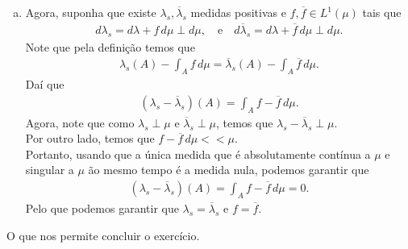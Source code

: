 \begin{homeworkProblem}[6]
\begin{solution}
\begin{enumerate}[a)]
      \begin{align*}
        \left( \lambda_s-\epsilon\mu \right)(B)=\lambda(B)-\int_{B}f\,d\mu-\epsilon\mu(B)\geq 0.
      \end{align*}
      Daí que
      \begin{align*}
        \lambda(B)\geq \int_{B}f+\epsilon\,d\mu,\quad\text{para todo }B\subseteq A.
      \end{align*}
      Logo, note que dado $C\in\cali{A}$ temos que pela desigualdade anterior e o item $b)$ podemos garantir que 
      \begin{align*}
        \lambda(C)=\lambda(A\cap C)+\lambda(C\setminus A)\geq \int_{A\cap C}f+\epsilon\,d\mu + \int_{C\setminus A}f\,d\mu=\int_{C}f+\epsilon\chi_{A}\,d\mu.
      \end{align*}
      Logo, $f+\epsilon\chi_A$ cumpre as condições de $S$, mas
      \begin{align*}
        \alpha=\int_{X}f\,d\mu<\int_{X}f\,d\mu +\epsilon\mu(A)\leq \int_{X}f+\epsilon\chi_{A}\,d\mu.
      \end{align*}
      O que contradice a maximalidade de $\alpha$. Assim, podemos garantir que $\lambda_s\perp \mu$.
    \item Agora, suponha que existe $\lambda_s,\overline{\lambda}_s$ medidas positivas e $f,\overline{f}\in L^{1}(\mu)$ tais que
      \begin{align*}
        d\lambda_s=d\lambda+f\,d\mu\perp d\mu,\quad\text{e}\quad d\overline{\lambda}_s=d\lambda+\overline{f}\,d\mu\perp d\mu.
      \end{align*}
      Note que pela definição temos que
      \begin{align*}
        \lambda_s(A)-\int_{A}f\,d\mu = \overline{\lambda}_s(A)-\int_{A}\overline{f}\,d\mu.
      \end{align*}
      Daí que
      \begin{align*}
        (\lambda_s-\overline{\lambda}_s)(A)=\int_{A}f-\overline{f}\,d\mu.
      \end{align*}
      Agora, note que como $\lambda_s\perp\mu$ e $\overline{\lambda}_s\perp \mu$, temos que $\lambda_s-\overline{\lambda}_s\perp \mu$.\\
      Por outro lado, temos que $f-\overline{f}\,d\mu << \mu$.\\
      Portanto, usando que a única medida que é absolutamente contínua a $\mu$ e singular a $\mu$ ão mesmo tempo é a medida nula, podemos garantir que
      \begin{align*}
        (\lambda_s-\overline{\lambda}_s)(A)=\int_{A}f-\overline{f}\,d\mu=0. 
      \end{align*}
      Pelo que podemos garantir que $\lambda_s=\overline{\lambda}_s$ e $f=\overline{f}$. 
  \end{enumerate} 
  O que nos permite concluir o exercício.
  \end{solution}
\end{homeworkProblem}
